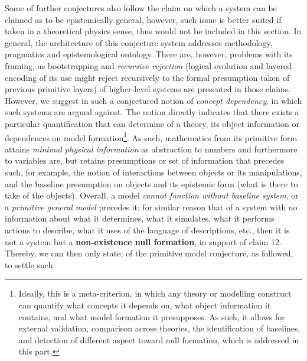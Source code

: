 Some of further conjectures also follow the claim on which a system can be claimed as to be epistemically general, however, such issue is better suited if taken in a theoretical physics sense, thus would not be included in this section. In general, the architecture of this conjecture system addresses methodology, pragmatics and epistemological ontology. There are, however, problems with its framing, as bootstrapping and \textit{recursive rejection} (logical evolution and layered encoding of its use might reject recursively to the formal presumption taken of previous primitive layers) of higher-level systems are presented in those claims. However, we suggest in such a conjectured notion of \textit{concept dependency}, in which such systems are argued against. The notion directly indicates that there exists a particular quantification that can determine of a theory, its object information or dependences on model formation\footnote{Ideally, this is a meta-criterion, in which any theory or modelling construct can quantify what concepts it depends on, what object information it contains, and what model formation it presupposes. As such, it allows for external validation, comparison across theories, the identification of baselines, and detection of different aspect toward null formation, which is addressed in this part.}. As such, mathematics from its primitive form attains \textit{minimal physical information} as abstraction to numbers and furthermore to variables are, but retains presumptions or set of information that precedes such, for example, the notion of interactions between objects or its manipulations, and the baseline presumption on objects and its epistemic form (what is there to take of the objects). Overall, a model \textit{cannot function without baseline system}, or a \textit{primitive general model} precedes it; for similar reason that of a system with no information about what it determines, what it simulates, what it performs actions to describe, what it uses of the language of descriptions, etc., then it is not a system but a \textbf{non-existence null formation}, in support of claim 12. Thereby, we can then only state, of the primitive model conjecture, as followed, to settle such:

